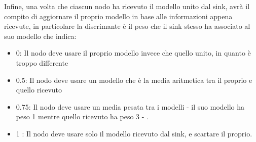 Infine, una volta che ciascun nodo ha ricevuto il modello unito dal sink, avrà il compito di aggiornare il proprio modello in base alle informazioni appena ricevute, in particolare la discrimante è il peso che il sink stesso ha associato al suo modello che indica:
\begin{itemize}
  \item 0: Il nodo deve usare il proprio modello invece che quello unito, in quanto è troppo differente
  \item 0.5: Il nodo deve usare un modello che è la media aritmetica tra il proprio e quello ricevuto
  \item 0.75: Il nodo deve usare un media pesata tra i modelli - il suo modello ha peso 1 mentre quello ricevuto ha peso 3 - .
  \item 1 :  Il nodo deve usare solo il modello ricevuto dal sink, e scartare il proprio.
\end{itemize}


